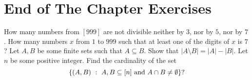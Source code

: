 \section*{End of The Chapter Exercises}
\begin{exercises}
  \exerciseitem How many numbers from $[999]$ are not divisible neither by $3$,
    nor by $5$, nor by $7$.
  \exerciseitem How many numbers $x$ from $1$ to $999$ such that at least one
    of the digits of $x$ is $7$?
  \exerciseitem Let $A, B$ be some finite sets such that $A \subseteq B$.
    Show that $|A \setminus B| = |A| - |B|$.
  \exerciseitem Let $n$ be some positive integer.
    Find the cardinality of the set
    \[
      \set[{A, B \subseteq [n] \text{ and } A \cap B \neq \emptyset}]{(A, B)}?
    \]
\end{exercises}
